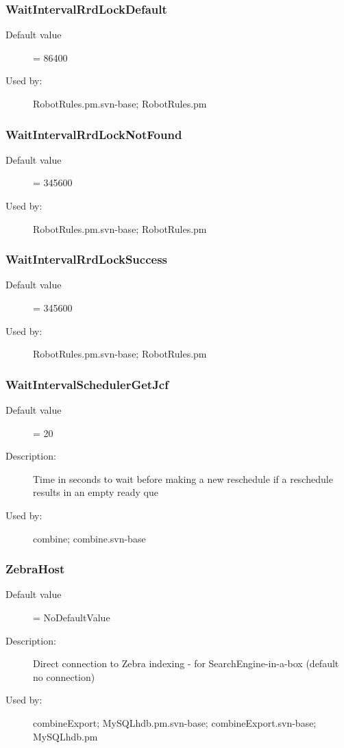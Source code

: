 \subsubsection{WaitIntervalRrdLockDefault}
\label{WaitIntervalRrdLockDefault}
\begin{description}
\item[Default value] = 86400
\item[Used by:] RobotRules.pm.svn-base; RobotRules.pm
\end{description}
\subsubsection{WaitIntervalRrdLockNotFound}
\label{WaitIntervalRrdLockNotFound}
\begin{description}
\item[Default value] = 345600
\item[Used by:] RobotRules.pm.svn-base; RobotRules.pm
\end{description}
\subsubsection{WaitIntervalRrdLockSuccess}
\label{WaitIntervalRrdLockSuccess}
\begin{description}
\item[Default value] = 345600
\item[Used by:] RobotRules.pm.svn-base; RobotRules.pm
\end{description}
\subsubsection{WaitIntervalSchedulerGetJcf}
\label{WaitIntervalSchedulerGetJcf}
\begin{description}
\item[Default value] = 20
\item[Description:] Time in seconds to wait before making a new reschedule if a reschedule results in an empty ready que
\item[Used by:] combine; combine.svn-base
\end{description}
\subsubsection{ZebraHost}
\label{ZebraHost}
\begin{description}
\item[Default value] = NoDefaultValue
\item[Description:] Direct connection to Zebra indexing - for SearchEngine-in-a-box (default no connection)
\item[Used by:] combineExport; MySQLhdb.pm.svn-base; combineExport.svn-base; MySQLhdb.pm
\end{description}
